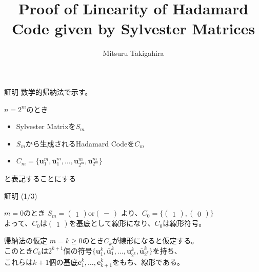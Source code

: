 \documentclass[dvipdfmx,10pt,jsarticle]{beamer}
\title{Proof of Linearity of Hadamard Code given by Sylvester Matrices}
\author{Mitsuru Takigahira}
\date[2017/10/20]{}
\begin{document}
  \frame{\maketitle}
  
  \begin{frame}{証明}
    数学的帰納法で示す。

    $n = 2^m$のとき
    \begin{itemize}
      \item Sylvester Matrixを$S_m$
      \item $S_m$から生成されるHadamard Codeを$C_m$
      \item $C_m = \lbrace \mathbf{u}_1^m, \bar{\mathbf{u}}^m_1, \ldots , \mathbf{u}_{2^m}^m, \bar{\mathbf{u}}^m_{2^m} \rbrace$
    \end{itemize}
    と表記することにする
  \end{frame}

  \begin{frame}{証明 (1/3)}
    \begin{block}{$m=0$のとき}
      $S_m = \begin{pmatrix}
        1
      \end{pmatrix} \text{or} \begin{pmatrix}
        -
      \end{pmatrix}$
      より、$C_0 = \lbrace \begin{pmatrix} 1 \end{pmatrix}, \begin{pmatrix} 0 \end{pmatrix} \rbrace$ \\
      よって、$C_0$は$\begin{pmatrix} 1 \end{pmatrix}$を基底として線形になり、$C_0$は線形符号。
    \end{block}
    \begin{block}{帰納法の仮定}
      $m = k \geq 0$のとき$C_k$が線形になると仮定する。 \\
      このとき$C_k$は$2^{k+1}$個の符号$\lbrace \mathbf{u}^k_1, \bar{\mathbf{u}}^k_1, \ldots , \mathbf{u}^k_{2^k}, \bar{\mathbf{u}}^k_{2^k} \rbrace$を持ち、\\
      これらは$k + 1$個の基底$\mathbf{e}^k_1, \ldots, \mathbf{e}^k_{k+1}$をもち、線形である。
    \end{block}
  \end{frame}
\end{document}
